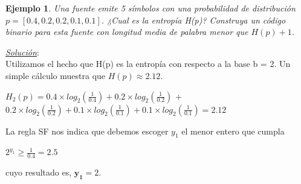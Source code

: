 \documentclass{beamer}
\newtheorem{ejemplo} [Ejemplo] {Ejemplo}
\begin{document}
\begin{frame}  \small

\begin{ejemplo}

Una fuente emite 5 símbolos con una probabilidad de distribución $p = [0.4, 0.2, 0.2, 0.1, 0.1]$.
¿Cual es la entropía H(p)? Construya un código binario para esta fuente con longitud media de palabra menor que $H(p) + 1$.\\
\end{ejemplo}

\pause

\textit{\underline{Solución}}:\\
	Utilizamos el hecho que H(p) es la entropía con respecto a la base b = 2. Un simple cálculo muestra que $H(p) \approx 2.12$. 
	
\begin{center}
$H_2(p)	=  0.4 \times log_2(\frac{1}{0.4})+ 0.2 \times log_2(\frac{1}{0.2})$ + $0.2 \times log_2(\frac{1}{0.2}) + 0.1 \times log_2(\frac{1}{0.1}) + 0.1 \times log_2(\frac{1}{0.1}) =2.12$
\end{center}

La regla SF nos indica que debemos escoger $y_1$ el menor entero que cumpla

\begin{center}
$2^{y_{1}} \geq \frac{1}{0.4} = 2.5$
\end{center}

cuyo resultado es, $\mathbf {y_1} = 2$.  



\end{frame} 
\end{document}
